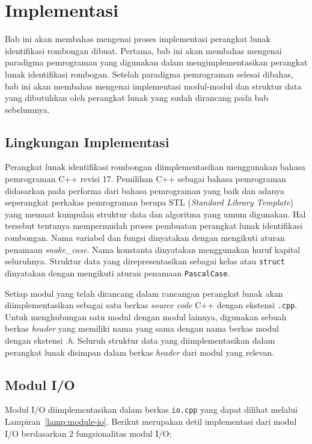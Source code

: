 \chapter{Implementasi}
\label{chap:implementasi}

Bab ini akan membahas mengenai proses implementasi perangkat lunak identifikasi rombongan dibuat. Pertama, bab ini akan membahas mengenai paradigma pemrograman yang digunakan dalam mengimplementasikan perangkat lunak identifikasi rombogan. Setelah paradigma pemrograman selesai dibahas, bab ini akan membahas mengenai implementasi modul-modul dan struktur data yang dibutuhkan oleh perangkat lunak yang sudah dirancang pada bab sebelumnya.

\section{Lingkungan Implementasi}
\label{sec:implementation-environment}

Perangkat lunak identifikasi rombongan diimplementasikan menggunakan bahasa pemrograman C++ revisi 17. Pemilihan C++ sebagai bahasa pemrograman didasarkan pada performa dari bahasa pemrograman yang baik dan adanya seperangkat perkakas pemrograman berupa STL (\textit{Standard Library Template}) yang memuat kumpulan struktur data dan algoritma yang umum digunakan. Hal tersebut tentunya mempermudah proses pembuatan perangkat lunak identifikasi rombongan. Nama variabel dan fungsi dinyatakan dengan mengikuti aturan penamaan \textit{snake\_case}. Nama konstanta dinyatakan menggunakan huruf kapital seluruhnya. Struktur data yang direpresentasikan sebagai kelas atau \texttt{struct} dinyatakan dengan mengikuti aturan penamaan \texttt{PascalCase}.

Setiap modul yang telah dirancang dalam rancangan perangkat lunak akan diimplementasikan sebagai satu berkas \textit{source code} C++ dengan ekstensi \texttt{.cpp}. Untuk menghubungan satu modul dengan modul lainnya, digunakan sebuah berkas \textit{header} yang memiliki nama yang sama dengan nama berkas modul dengan ekstensi \textit{.h}. Seluruh struktur data yang diimplementasikan dalam perangkat lunak disimpan dalam berkas \textit{header} dari modul yang relevan.

\section{Modul I/O}
\label{sec:impl-io}

Modul I/O diimplementasikan dalam berkas \texttt{io.cpp} yang dapat dilihat melalui Lampiran~\ref{lamp:module-io}. Berikut merupakan detil implementasi dari modul I/O berdasarkan 2 fungsionalitas modul I/O:

